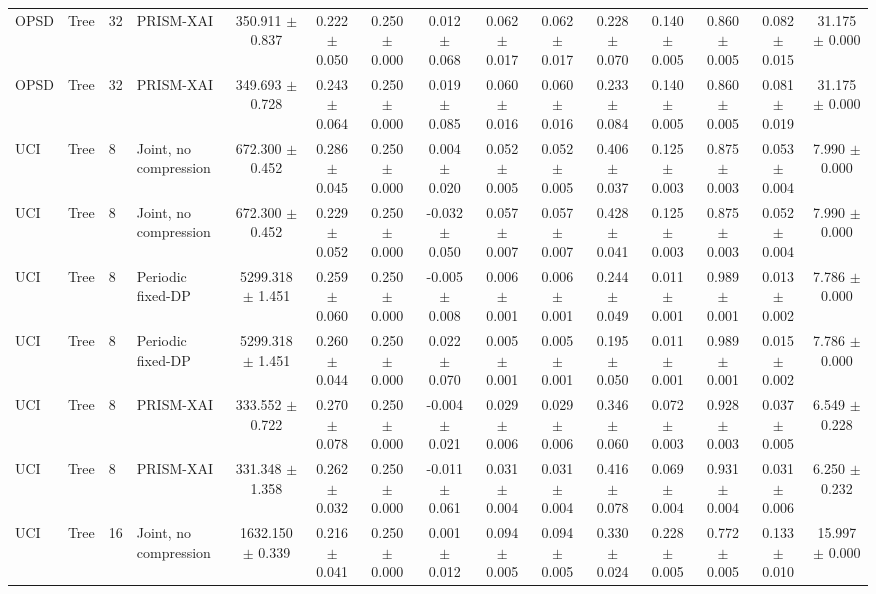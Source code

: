 \begin{table}[t]
\begin{tabular}{llllccccccccccc}
OPSD & Tree & 32 & PRISM-XAI & 350.911 $\pm$ 0.837 & 0.222 $\pm$ 0.050 & 0.250 $\pm$ 0.000 & 0.012 $\pm$ 0.068 & 0.062 $\pm$ 0.017 & 0.062 $\pm$ 0.017 & 0.228 $\pm$ 0.070 & 0.140 $\pm$ 0.005 & 0.860 $\pm$ 0.005 & 0.082 $\pm$ 0.015 & 31.175 $\pm$ 0.000 \\
OPSD & Tree & 32 & PRISM-XAI & 349.693 $\pm$ 0.728 & 0.243 $\pm$ 0.064 & 0.250 $\pm$ 0.000 & 0.019 $\pm$ 0.085 & 0.060 $\pm$ 0.016 & 0.060 $\pm$ 0.016 & 0.233 $\pm$ 0.084 & 0.140 $\pm$ 0.005 & 0.860 $\pm$ 0.005 & 0.081 $\pm$ 0.019 & 31.175 $\pm$ 0.000 \\
UCI & Tree & 8 & Joint, no compression & 672.300 $\pm$ 0.452 & 0.286 $\pm$ 0.045 & 0.250 $\pm$ 0.000 & 0.004 $\pm$ 0.020 & 0.052 $\pm$ 0.005 & 0.052 $\pm$ 0.005 & 0.406 $\pm$ 0.037 & 0.125 $\pm$ 0.003 & 0.875 $\pm$ 0.003 & 0.053 $\pm$ 0.004 & 7.990 $\pm$ 0.000 \\
UCI & Tree & 8 & Joint, no compression & 672.300 $\pm$ 0.452 & 0.229 $\pm$ 0.052 & 0.250 $\pm$ 0.000 & -0.032 $\pm$ 0.050 & 0.057 $\pm$ 0.007 & 0.057 $\pm$ 0.007 & 0.428 $\pm$ 0.041 & 0.125 $\pm$ 0.003 & 0.875 $\pm$ 0.003 & 0.052 $\pm$ 0.004 & 7.990 $\pm$ 0.000 \\
UCI & Tree & 8 & Periodic fixed-DP & 5299.318 $\pm$ 1.451 & 0.259 $\pm$ 0.060 & 0.250 $\pm$ 0.000 & -0.005 $\pm$ 0.008 & 0.006 $\pm$ 0.001 & 0.006 $\pm$ 0.001 & 0.244 $\pm$ 0.049 & 0.011 $\pm$ 0.001 & 0.989 $\pm$ 0.001 & 0.013 $\pm$ 0.002 & 7.786 $\pm$ 0.000 \\
UCI & Tree & 8 & Periodic fixed-DP & 5299.318 $\pm$ 1.451 & 0.260 $\pm$ 0.044 & 0.250 $\pm$ 0.000 & 0.022 $\pm$ 0.070 & 0.005 $\pm$ 0.001 & 0.005 $\pm$ 0.001 & 0.195 $\pm$ 0.050 & 0.011 $\pm$ 0.001 & 0.989 $\pm$ 0.001 & 0.015 $\pm$ 0.002 & 7.786 $\pm$ 0.000 \\
UCI & Tree & 8 & PRISM-XAI & 333.552 $\pm$ 0.722 & 0.270 $\pm$ 0.078 & 0.250 $\pm$ 0.000 & -0.004 $\pm$ 0.021 & 0.029 $\pm$ 0.006 & 0.029 $\pm$ 0.006 & 0.346 $\pm$ 0.060 & 0.072 $\pm$ 0.003 & 0.928 $\pm$ 0.003 & 0.037 $\pm$ 0.005 & 6.549 $\pm$ 0.228 \\
UCI & Tree & 8 & PRISM-XAI & 331.348 $\pm$ 1.358 & 0.262 $\pm$ 0.032 & 0.250 $\pm$ 0.000 & -0.011 $\pm$ 0.061 & 0.031 $\pm$ 0.004 & 0.031 $\pm$ 0.004 & 0.416 $\pm$ 0.078 & 0.069 $\pm$ 0.004 & 0.931 $\pm$ 0.004 & 0.031 $\pm$ 0.006 & 6.250 $\pm$ 0.232 \\
UCI & Tree & 16 & Joint, no compression & 1632.150 $\pm$ 0.339 & 0.216 $\pm$ 0.041 & 0.250 $\pm$ 0.000 & 0.001 $\pm$ 0.012 & 0.094 $\pm$ 0.005 & 0.094 $\pm$ 0.005 & 0.330 $\pm$ 0.024 & 0.228 $\pm$ 0.005 & 0.772 $\pm$ 0.005 & 0.133 $\pm$ 0.010 & 15.997 $\pm$ 0.000 \\

\end{tabular}
\end{table}
